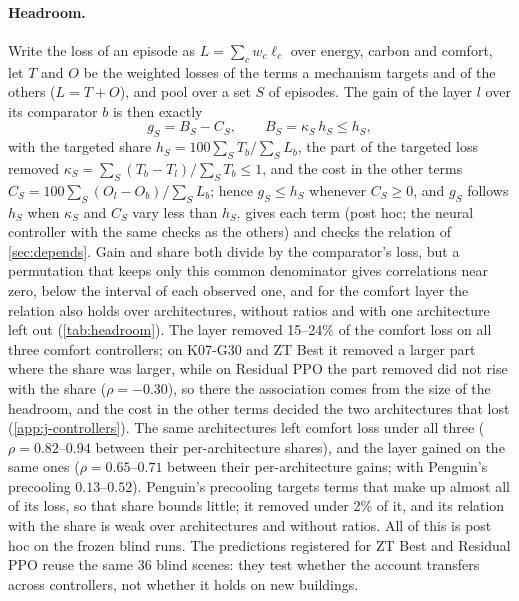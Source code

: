 \paragraph{Headroom.} Write the loss of an episode as $L = \sum_c w_c \ell_c$ over energy, carbon and comfort, let $T$ and
$O$ be the weighted losses of the terms a mechanism targets and of the others ($L = T + O$), and pool over a set $S$ of
episodes. The gain of the layer $l$ over its comparator $b$ is then exactly
\begin{equation}\label{eq:headroom}
g_S = B_S - C_S, \qquad B_S = \kappa_S\, h_S \le h_S,
\end{equation}
with the targeted share $h_S = 100 \sum_S T_b / \sum_S L_b$, the part of the targeted loss removed
$\kappa_S = \sum_S (T_b - T_l) / \sum_S T_b \le 1$, and the cost in the other terms
$C_S = 100 \sum_S (O_l - O_b) / \sum_S L_b$; hence $g_S \le h_S$ whenever $C_S \ge 0$, and $g_S$ follows $h_S$ when $\kappa_S$
and $C_S$ vary less than $h_S$.  gives each term (post hoc; the neural controller with the same checks
as the others) and checks the relation of \cref{sec:depends}. Gain and share both divide by the comparator's loss,
but a permutation that keeps only this common denominator gives correlations near zero, below the interval of each observed one, and for the comfort
layer the relation also holds over architectures, without ratios and with one architecture left out (\cref{tab:headroom}). The layer removed 15--24\% of
the comfort loss on all three comfort controllers; on K07-G30 and ZT Best it removed a larger part where the share was larger,
while on Residual PPO the part removed did not rise with the share ($\rho = -0.30$), so there the association comes from the size of the headroom, and the cost in the other terms decided the two
architectures that lost (\cref{app:j-controllers}). The same architectures left comfort loss under all three ($\rho = 0.82$--$0.94$ between their per-architecture
shares), and the layer gained on the same ones ($\rho = 0.65$--$0.71$ between their per-architecture gains; with Penguin's
precooling $0.13$--$0.52$). Penguin's precooling targets terms that make up almost all of its loss, so that share bounds
little; it removed under 2\% of it, and its relation with the share is weak over architectures and without ratios. All of
this is post hoc on the frozen blind runs. The predictions registered for ZT Best and Residual PPO reuse the same 36
blind scenes: they test whether the account transfers across controllers, not whether it holds on new buildings.
